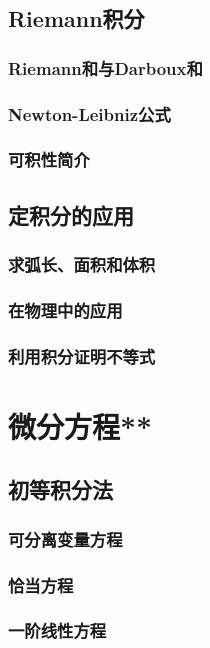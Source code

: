\section{Riemann积分}
\subsection{Riemann和与Darboux和}
\clearpage
\subsection{Newton-Leibniz公式}
\clearpage
\subsection{可积性简介}
\clearpage

\section{定积分的应用}
\subsection{求弧长、面积和体积}
\clearpage
\subsection{在物理中的应用}
\clearpage
\subsection{利用积分证明不等式}

\clearpage
\chapter{微分方程**}
\section{初等积分法}
\subsection{可分离变量方程}
\clearpage
\subsection{恰当方程}
\clearpage
\subsection{一阶线性方程}
\clearpage
